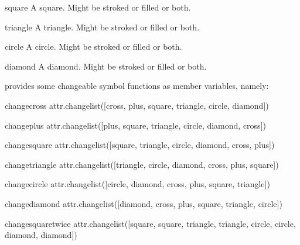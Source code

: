 \begin{memberdesc}{square}
  A square. Might be stroked or filled or both.
\end{memberdesc}

\begin{memberdesc}{triangle}
  A triangle. Might be stroked or filled or both.
\end{memberdesc}

\begin{memberdesc}{circle}
  A circle. Might be stroked or filled or both.
\end{memberdesc}

\begin{memberdesc}{diamond}
  A diamond. Might be stroked or filled or both.
\end{memberdesc}

 provides some changeable symbol functions as member
variables, namely:

\begin{memberdesc}{changecross}
  attr.changelist([cross, plus, square, triangle, circle, diamond])
\end{memberdesc}

\begin{memberdesc}{changeplus}
  attr.changelist([plus, square, triangle, circle, diamond, cross])
\end{memberdesc}

\begin{memberdesc}{changesquare}
  attr.changelist([square, triangle, circle, diamond, cross, plus])
\end{memberdesc}

\begin{memberdesc}{changetriangle}
  attr.changelist([triangle, circle, diamond, cross, plus, square])
\end{memberdesc}

\begin{memberdesc}{changecircle}
  attr.changelist([circle, diamond, cross, plus, square, triangle])
\end{memberdesc}

\begin{memberdesc}{changediamond}
  attr.changelist([diamond, cross, plus, square, triangle, circle])
\end{memberdesc}

\begin{memberdesc}{changesquaretwice}
  attr.changelist([square, square, triangle, triangle, circle, circle, diamond, diamond])
\end{memberdesc}

